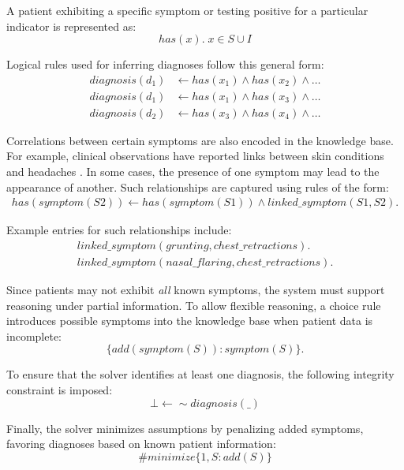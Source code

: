 \documentclass[10pt,leqno]{amsart}
\begin{document}
A patient exhibiting a specific symptom or testing positive for a particular indicator is represented as:
\begin{equation}
    has(x). \; x \in S \cup I
\end{equation}

Logical rules used for inferring diagnoses follow this general form:
\begin{align}
    diagnosis(d_1) & \longleftarrow has(x_1) \land has(x_2) \land \dots \\
    diagnosis(d_1) & \longleftarrow has(x_1) \land has(x_3) \land \dots \\
    diagnosis(d_2) & \longleftarrow has(x_3) \land has(x_4) \land \dots
\end{align}

Correlations between certain symptoms are also encoded in the knowledge base. 
For example, clinical observations have reported links between skin conditions and headaches \cite{migraine-hives}. 
In some cases, the presence of one symptom may lead to the appearance of another. 
Such relationships are captured using rules of the form:
\begin{align}
    has(symptom(S2)) \longleftarrow has(symptom(S1)) \land linked\_symptom(S1, S2).
\end{align}

Example entries for such relationships include:
\begin{align}
    linked\_symptom(grunting, chest\_retractions).\\
    linked\_symptom(nasal\_flaring, chest\_retractions).
\end{align}

Since patients may not exhibit \textit{all} known symptoms, 
the system must support reasoning under partial information. 
To allow flexible reasoning, a choice rule introduces possible symptoms 
into the knowledge base when patient data is incomplete:
\begin{equation}
    \{ add(symptom(S)) : symptom(S) \}.
\end{equation}

To ensure that the solver identifies at least one diagnosis, 
the following integrity constraint is imposed:
\begin{equation}
    \bot \longleftarrow \sim diagnosis(\_)
\end{equation}

Finally, the solver minimizes assumptions by penalizing added symptoms, 
favoring diagnoses based on known patient information:
\begin{equation}
    \#minimize \{ 1, S : add(S) \}
\end{equation}
\end{document}
